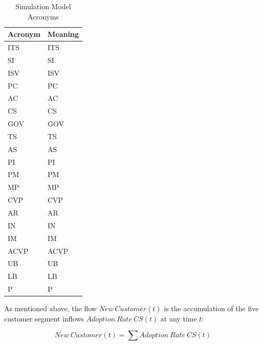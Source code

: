 \begin{table}[t]
	\centering
	\begin{tabular}{ll}
			\toprule 
			\footnotesize \textbf{Acronym} & \footnotesize \textbf{Meaning}	 \\ \midrule
			\footnotesize \acs{ITS} & \footnotesize \acl{ITS}\\
			\footnotesize \acs{SI} & \footnotesize \acl{SI}\\
			\footnotesize \acs{ISV} & \footnotesize \acl{ISV}\\
			\footnotesize \acs{PC} & \footnotesize \acl{PC}\\
			\footnotesize \acs{AC} & \footnotesize \acl{AC}\\ 
			\footnotesize \acs{CS} & \footnotesize \acl{CS}\\ \midrule
			\footnotesize \acs{GOV} & \footnotesize \acl{GOV}\\
			\footnotesize \acs{TS} & \footnotesize \acl{TS}\\
			\footnotesize \acs{AS} & \footnotesize \acl{AS}\\ \midrule
			\footnotesize \acs{PI} & \footnotesize \acl{PI}\\
			\footnotesize \acs{PM} & \footnotesize \acl{PM}\\
			\footnotesize \acs{MP} & \footnotesize \acl{MP}\\ \midrule
			\footnotesize \acs{CVP} & \footnotesize \acl{CVP}\\
			\footnotesize \acs{AR} & \footnotesize \acl{AR} \\ 
			\footnotesize \acs{IN} & \footnotesize \acl{IN} \\ 
			\footnotesize \acs{IM} & \footnotesize \acl{IM} \\ 
			\footnotesize \acs{ACVP} & \footnotesize \acl{ACVP} \\ 
			\footnotesize \acs{UB} & \footnotesize \acl{UB} \\
			\footnotesize \acs{LB} & \footnotesize \acl{LB}\\
			\footnotesize \acs{P} & \footnotesize \acl{P}\\ \bottomrule
	\end{tabular}
	\caption{Simulation Model Acronyms}
	\label{tab:acro}
\end{table}

As mentioned above, the flow $New~Customer(t)$ is the accumulation of the five customer segment inflows $Adoption~Rate~CS(t)$ at any time $t$:

\begin{equation}\label{eq:nc}
	\mathit{New~Customer(t)} = \sum{\mathit{Adoption~Rate~CS(t)}}
\end{equation}

